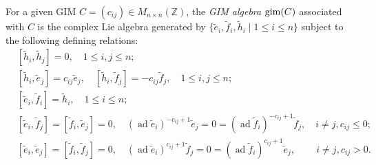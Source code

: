 \documentclass[12pt,reqno]{amsart}
\numberwithin{equation}{section}
\begin{document}
	For a given GIM $C=(c_{ij})\in M_{n\times n}(\mathbb{Z})$, the {\em GIM algebra} ${\rm gim}(C)$ associated with $C$ is the complex Lie algebra generated by $\{\widetilde{e}_i,\widetilde{f}_i,\widetilde{h}_i\mid 1\le i\le n\}$ subject to the following defining relations:
	\begin{align}
		&[\widetilde{h}_{i}, \widetilde{h}_{j}]=0,\quad 1 \leq i, j \leq n;\label{rel:gim-1}\\
		&[\widetilde{h}_{i}, \widetilde{e}_{j}]=c_{ij} \widetilde{e}_{j},\quad [\widetilde{h}_{i}, \widetilde{f}_{j}]=-c_{ij} \widetilde{f}_{j},\quad 1 \leq i, j \leq n;\label{rel:gim-2}\\
		& [\widetilde{e}_i,\widetilde{f}_i]=\widetilde{h}_i,\quad 1\le i\le n;\label{rel:gim-3}\\
		& [\widetilde{e}_{i}, \widetilde{f}_{j}]=[\widetilde{f}_i,\widetilde{e}_j]=0,\quad 
		(\operatorname{ad} \widetilde{e}_{i})^{-c_{ij}+1} \widetilde{e}_{j}=0= (\operatorname{ad} \widetilde{f}_{i})^{-c_{ij}+1} \widetilde{f}_{j},\quad i \neq j, c_{i j} \leq 0;\label{rel:gim-4}\\
		& [\widetilde{e}_{i},\widetilde{e}_{j}]=[\widetilde{f}_{i}, \widetilde{f}_{j}]=0,\quad 
		(\operatorname{ad} \widetilde{e}_{i})^{c_{ij}+1} \widetilde{f}_{j}=0= (\operatorname{ad} \widetilde{f}_{i})^{c_{ij}+1} \widetilde{e}_{j},\quad\quad\,  i \neq j,
		c_{i j}>0.\label{rel:gim-5}
	\end{align}
\end{document}
